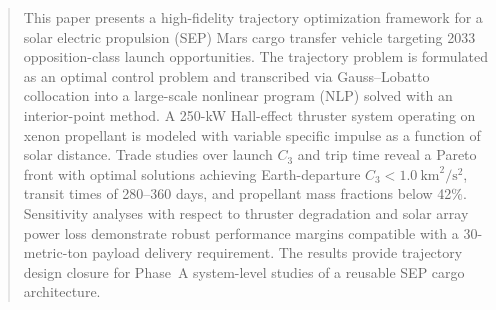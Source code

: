 \documentclass{aiaa-tc}
\begin{document}
\maketitle

\noindent{}
\vspace{0.8em}



\begin{abstract}
This paper presents a high-fidelity trajectory optimization framework for a
solar electric propulsion (SEP) Mars cargo transfer vehicle targeting 2033
opposition-class launch opportunities.  The trajectory problem is formulated
as an optimal control problem and transcribed via Gauss–Lobatto collocation
into a large-scale nonlinear program (NLP) solved with an interior-point
method.  A 250-kW Hall-effect thruster system operating on xenon propellant
is modeled with variable specific impulse as a function of solar distance.
Trade studies over launch $C_3$ and trip time reveal a Pareto front with
optimal solutions achieving Earth-departure $C_3 < 1.0~\text{km}^2/\text{s}^2$,
transit times of 280–360 days, and propellant mass fractions below 42\%.
Sensitivity analyses with respect to thruster degradation and solar array
power loss demonstrate robust performance margins compatible with a 30-metric-ton
payload delivery requirement.  The results provide trajectory design closure
for Phase~A system-level studies of a reusable SEP cargo architecture.
\end{abstract}







\end{document}
